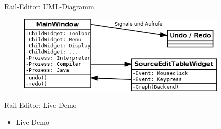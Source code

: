 \begin{frame}{Rail-Editor: UML-Diagramm}	
	\begin{figure}
		\centering
		\includegraphics[width=0.9\textwidth]{editor-uebersicht}
	\end{figure}
\end{frame}

\begin{frame}{Rail-Editor: Live Demo}
	\begin{itemize}
		\item Live Demo
	\end{itemize}
\end{frame}
